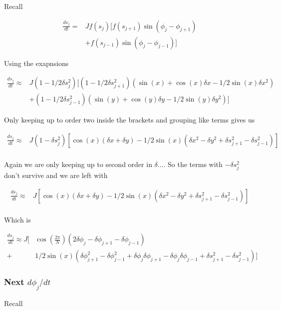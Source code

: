 \documentclass{article}
\begin{document}
Recall

\begin{align*}
    \frac{ds_j}{dt} = &Jf(s_j)[f(s_{j+1})\sin(\phi_j - \phi_{j+1})\\
                      &+f(s_{j-1})\sin(\phi_j - \phi_{j-1})]
\end{align*}

Using the exapnsions

\begin{align*}
    \frac{ds_j}{dt} \approx &J(1-1/2\delta s_j^2)[(1-1/2\delta s_{j+1}^2)(\sin(x) + \cos(x)\delta x - 1/2\sin(x)\delta x^2)\\
                      &+(1-1/2\delta s_{j-1}^2)(\sin(y) + \cos(y)\delta y - 1/2\sin(y)\delta y^2)]
\end{align*}

Only keeping up to order two inside the brackets and grouping like terms gives us

\begin{align*}
    \frac{ds_j}{dt} \approx &J(1-\delta s_j^2)[\cos(x)(\delta x + \delta y) - 1/2\sin(x)(\delta x^2 - \delta y^2 + \delta s_{j+1}^2 - \delta s_{j-1}^2)]\\
\end{align*}

Again we are only keeping up to second order in $\delta ...$. So the terms with $-\delta s_j^2$ don't survive and we are left with 

\begin{align*}
    \frac{ds_j}{dt} \approx &J[\cos(x)(\delta x + \delta y) - 1/2\sin(x)(\delta x^2 - \delta y^2 + \delta s_{j+1}^2 - \delta s_{j-1}^2)]\\
\end{align*}

Which is

\begin{align*}
    \frac{ds_j}{dt} \approx J[&\cos(\frac{2\pi}{N})(2\delta\phi_{j} - \delta\phi_{j+1} - \delta\phi_{j-1}) \\
                                +&1/2\sin(x)(\delta\phi_{j+1}^2 - \delta\phi_{j-1}^2 + \delta\phi_{j}\delta\phi_{j+1} - \delta\phi_{j}\delta\phi_{j-1} + \delta s_{j+1}^2 - \delta s_{j-1}^2)]
\end{align*}

\subsubsection{Next $d\phi_j/dt$}

Recall
\end{document}
